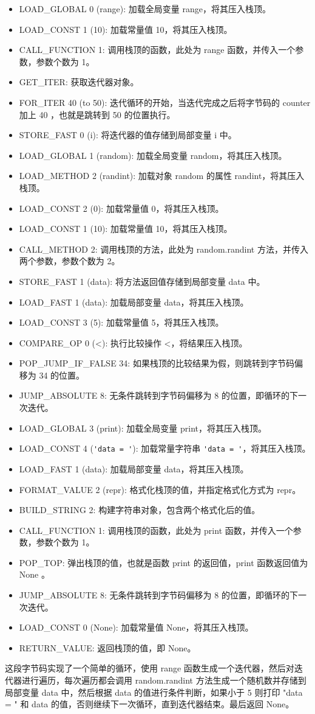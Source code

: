 \begin{itemize}
\item LOAD\_GLOBAL 0 (range): 加载全局变量 range，将其压入栈顶。 
\item LOAD\_CONST 1 (10): 加载常量值 10，将其压入栈顶。 
\item CALL\_FUNCTION 1: 调用栈顶的函数，此处为 range 函数，并传入一个参数，参数个数为 1。 
\item GET\_ITER: 获取迭代器对象。 
\item FOR\_ITER 40 (to 50): 迭代循环的开始，当迭代完成之后将字节码的 counter 加上 40 ，也就是跳转到 50 的位置执行。 
\item STORE\_FAST 0 (i): 将迭代器的值存储到局部变量 i 中。 
\item LOAD\_GLOBAL 1 (random): 加载全局变量 random，将其压入栈顶。 
\item LOAD\_METHOD 2 (randint): 加载对象 random 的属性 randint，将其压入栈顶。 
\item LOAD\_CONST 2 (0): 加载常量值 0，将其压入栈顶。 
\item LOAD\_CONST 1 (10): 加载常量值 10，将其压入栈顶。 
\item CALL\_METHOD 2: 调用栈顶的方法，此处为 random.randint 方法，并传入两个参数，参数个数为 2。 
\item STORE\_FAST 1 (data): 将方法返回值存储到局部变量 data 中。 
\item LOAD\_FAST 1 (data): 加载局部变量 data，将其压入栈顶。 
\item LOAD\_CONST 3 (5): 加载常量值 5，将其压入栈顶。 
\item COMPARE\_OP 0 (<): 执行比较操作 <，将结果压入栈顶。 
\item POP\_JUMP\_IF\_FALSE 34: 如果栈顶的比较结果为假，则跳转到字节码偏移为 34 的位置。 
\item JUMP\_ABSOLUTE 8: 无条件跳转到字节码偏移为 8 的位置，即循环的下一次迭代。 
\item LOAD\_GLOBAL 3 (print): 加载全局变量 print，将其压入栈顶。 
\item LOAD\_CONST 4 (\verb|'data = '|): 加载常量字符串 \verb|'data = '|，将其压入栈顶。 
\item LOAD\_FAST 1 (data): 加载局部变量 data，将其压入栈顶。 
\item FORMAT\_VALUE 2 (repr): 格式化栈顶的值，并指定格式化方式为 repr。 
\item BUILD\_STRING 2: 构建字符串对象，包含两个格式化后的值。 
\item CALL\_FUNCTION 1: 调用栈顶的函数，此处为 print 函数，并传入一个参数，参数个数为 1。 
\item POP\_TOP: 弹出栈顶的值，也就是函数 print 的返回值，print 函数返回值为 None 。 
\item JUMP\_ABSOLUTE 8: 无条件跳转到字节码偏移为 8 的位置，即循环的下一次迭代。 
\item LOAD\_CONST 0 (None): 加载常量值 None，将其压入栈顶。 
\item RETURN\_VALUE: 返回栈顶的值，即 None。 
\end{itemize}
这段字节码实现了一个简单的循环，使用 range 函数生成一个迭代器，然后对迭代器进行遍历，每次遍历都会调用 random.randint 方法生成一个随机数并存储到局部变量 data 中，然后根据 data 的值进行条件判断，如果小于 5 则打印 "data = " 和 data 的值，否则继续下一次循环，直到迭代器结束。最后返回 None。
